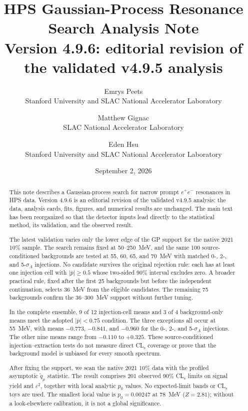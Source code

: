 \documentclass[11pt]{article}
\title{\vspace{-1.0em}HPS Gaussian-Process Resonance Search Analysis Note\\
\large Version 4.9.6: editorial revision of the validated v4.9.5 analysis}
\author{
Emrys Peets\\Stanford University and SLAC National Accelerator Laboratory
\and
Matthew Gignac\\SLAC National Accelerator Laboratory
\and
Eden Hsu\\Stanford University and SLAC National Accelerator Laboratory
}
\date{September 2, 2026}
\newcommand{\eps}{\varepsilon}
\newcommand{\CLs}{CL$_\mathrm{s}$}
\begin{document}
\maketitle

\begin{abstract}
This note describes a Gaussian-process search for narrow prompt $e^+e^-$ resonances
in HPS data.  Version 4.9.6 is an editorial revision of the validated v4.9.5 analysis:
the data, analysis cards, fits, figures, and numerical results are unchanged.  The main
text has been reorganized so that the detector inputs lead directly to the statistical
method, its validation, and the observed result.

The latest validation varies only the lower edge of the GP support for the native 2021
10\% sample.  The search remains fixed at 50--250~MeV, and the same 100
source-conditioned backgrounds are tested at 55, 60, 65, and 70~MeV with matched
    0-, 2-, and 5-$\sigma_A$ injections.  No candidate survives the original rejection
    rule: each has at least one injection cell with $|\overline p|\geq0.5$ whose two-sided
    90\% interval excludes zero.  A broader practical rule, fixed after the
first 25 backgrounds but before the independent continuation, selects 36~MeV from the
eligible candidates.  The remaining 75 backgrounds confirm the 36--300~MeV support
without further tuning.

In the complete ensemble, 9 of 12 injection-cell means and 3 of 4 background-only
means meet the adopted $|\overline p|<0.75$ condition.  The three exceptions all occur
at 55~MeV, with means $-0.773$, $-0.841$, and $-0.960$ for the 0-, 2-, and
5-$\sigma_A$ injections.  The other nine means range from $-0.110$ to $+0.325$.
These source-conditioned injection--extraction tests do not measure direct \CLs{}
coverage or prove that the background model is unbiased for every smooth spectrum.

After fixing the support, we scan the native 2021 10\% data with the profiled
asymptotic $\widetilde q_\mu$ statistic.  The result comprises 201 observed 90\%
\CLs{} limits on signal yield and $\eps^2$, together with local analytic $p_0$ values.
No expected-limit bands or \CLs{} toys are used.  The smallest local value is
$p_0=0.00247$ at 78~MeV ($Z=2.81$); without a look-elsewhere calibration, it is not a
global significance.
\end{abstract}

\tableofcontents
\clearpage


\clearpage
\end{document}
